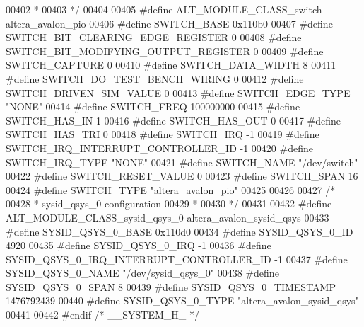 \begin{DoxyCode}
00402 \textcolor{comment}{ *}
00403 \textcolor{comment}{ */}
00404 
00405 \textcolor{preprocessor}{#define ALT\_MODULE\_CLASS\_switch altera\_avalon\_pio}
00406 \textcolor{preprocessor}{#define SWITCH\_BASE 0x110b0}
00407 \textcolor{preprocessor}{#define SWITCH\_BIT\_CLEARING\_EDGE\_REGISTER 0}
00408 \textcolor{preprocessor}{#define SWITCH\_BIT\_MODIFYING\_OUTPUT\_REGISTER 0}
00409 \textcolor{preprocessor}{#define SWITCH\_CAPTURE 0}
00410 \textcolor{preprocessor}{#define SWITCH\_DATA\_WIDTH 8}
00411 \textcolor{preprocessor}{#define SWITCH\_DO\_TEST\_BENCH\_WIRING 0}
00412 \textcolor{preprocessor}{#define SWITCH\_DRIVEN\_SIM\_VALUE 0}
00413 \textcolor{preprocessor}{#define SWITCH\_EDGE\_TYPE "NONE"}
00414 \textcolor{preprocessor}{#define SWITCH\_FREQ 100000000}
00415 \textcolor{preprocessor}{#define SWITCH\_HAS\_IN 1}
00416 \textcolor{preprocessor}{#define SWITCH\_HAS\_OUT 0}
00417 \textcolor{preprocessor}{#define SWITCH\_HAS\_TRI 0}
00418 \textcolor{preprocessor}{#define SWITCH\_IRQ -1}
00419 \textcolor{preprocessor}{#define SWITCH\_IRQ\_INTERRUPT\_CONTROLLER\_ID -1}
00420 \textcolor{preprocessor}{#define SWITCH\_IRQ\_TYPE "NONE"}
00421 \textcolor{preprocessor}{#define SWITCH\_NAME "/dev/switch"}
00422 \textcolor{preprocessor}{#define SWITCH\_RESET\_VALUE 0}
00423 \textcolor{preprocessor}{#define SWITCH\_SPAN 16}
00424 \textcolor{preprocessor}{#define SWITCH\_TYPE "altera\_avalon\_pio"}
00425 
00426 
00427 \textcolor{comment}{/*}
00428 \textcolor{comment}{ * sysid\_qsys\_0 configuration}
00429 \textcolor{comment}{ *}
00430 \textcolor{comment}{ */}
00431 
00432 \textcolor{preprocessor}{#define ALT\_MODULE\_CLASS\_sysid\_qsys\_0 altera\_avalon\_sysid\_qsys}
00433 \textcolor{preprocessor}{#define SYSID\_QSYS\_0\_BASE 0x110d0}
00434 \textcolor{preprocessor}{#define SYSID\_QSYS\_0\_ID 4920}
00435 \textcolor{preprocessor}{#define SYSID\_QSYS\_0\_IRQ -1}
00436 \textcolor{preprocessor}{#define SYSID\_QSYS\_0\_IRQ\_INTERRUPT\_CONTROLLER\_ID -1}
00437 \textcolor{preprocessor}{#define SYSID\_QSYS\_0\_NAME "/dev/sysid\_qsys\_0"}
00438 \textcolor{preprocessor}{#define SYSID\_QSYS\_0\_SPAN 8}
00439 \textcolor{preprocessor}{#define SYSID\_QSYS\_0\_TIMESTAMP 1476792439}
00440 \textcolor{preprocessor}{#define SYSID\_QSYS\_0\_TYPE "altera\_avalon\_sysid\_qsys"}
00441 
00442 \textcolor{preprocessor}{#endif }\textcolor{comment}{/* \_\_SYSTEM\_H\_ */}\textcolor{preprocessor}{}
\end{DoxyCode}
